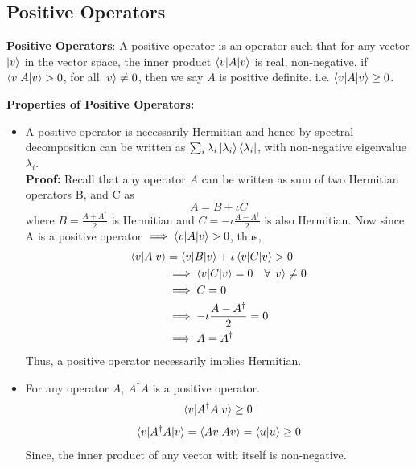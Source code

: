 \subsection{Positive Operators}

\begin{definition}
\textbf{Positive Operators}: A positive operator is an operator such that for any vector $\ket{v}$ in the vector space, the inner product $\braket{v|A|v}$ is real, non-negative, if $\braket{v|A|v} > 0$, for all $\ket{v} \neq 0$, then we say $A$ is positive definite.
i.e. $\braket{v|A|v} \geq 0$.\\
\end{definition}

\textbf{Properties of Positive Operators: }
\begin{itemize}
    \item A positive operator is necessarily Hermitian and hence by spectral decomposition can be written as $\sum_i \lambda_i\ket{\lambda_i}\bra{\lambda_i}$, with non-negative eigenvalue $\lambda_i$.\\
    \textbf{Proof: } Recall that any operator $A$ can be written as sum of two Hermitian operators B, and C as
    \[
    A=B+\iota C
    \]
    where $B=\frac{A+A^{\dagger}}{2}$ is Hermitian and $C=-\iota\frac{A-A^{\dagger}}{2}$ is also Hermitian. Now since A is a positive operator $\implies \braket{v|A|v} > 0$, thus,
    \begin{align*}
    \braket{v|A|v}&=\braket{v|B|v} +\iota \braket{v|C|v} > 0\\
    &\implies \braket{v|C|v}=0 \quad \forall \ket{v} \neq 0\\
    &\implies C=0\\
    &\implies -\iota \frac{A-A^{\dagger}}{2}=0\\
    &\implies A=A^{\dagger}
    \end{align*}
    Thus, a positive operator necessarily implies Hermitian.
    \item For any operator $A$, $A^{\dagger}A$ is a positive operator.
    \[ \braket{v|A^{\dagger}A|v} \geq 0 \]
    \[ \braket{v|A^{\dagger}A|v}=\braket{Av|Av} = \braket{u|u} \geq 0 \]
    Since, the inner product of any vector with itself is non-negative.
\end{itemize}
